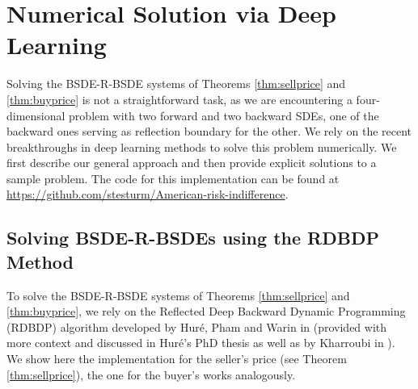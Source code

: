 \documentclass{article}
\begin{document}
\section{Numerical Solution via Deep Learning}\label{sec:deep}

Solving the BSDE-R-BSDE systems of Theorems \ref{thm:sellprice} and \ref{thm:buyprice} is not a straightforward task, as we are encountering a four-dimensional problem with two forward and two backward SDEs, one of the backward ones serving as reflection boundary for the other. We rely on the recent breakthroughs in deep learning methods to solve this problem numerically. We first describe our general approach and then provide explicit solutions to a sample problem. The code for this implementation can be found at \url{https://github.com/stesturm/American-risk-indifference}.



\subsection{Solving BSDE-R-BSDEs using the RDBDP Method}

To solve the BSDE-R-BSDE systems of Theorems \ref{thm:sellprice} and \ref{thm:buyprice}, we rely on the Reflected Deep Backward Dynamic Programming (RDBDP) algorithm developed by Hur\'{e}, Pham and Warin in \cite{HPW20} (provided with more context and discussed in Hur\'{e}'s PhD thesis \cite{Hur19} as well as by Kharroubi in \cite{Kha21}). We show here the implementation for the seller's price (see Theorem \ref{thm:sellprice}), the one for the buyer's works analogously.
\end{document}
